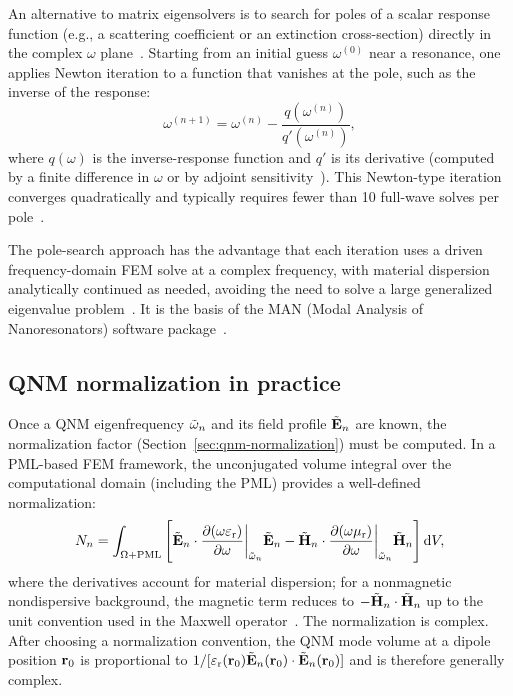 An alternative to matrix eigensolvers is to search for poles of a
scalar response function (e.g., a scattering coefficient or an
extinction cross-section) directly in the complex $\omega$
plane~\cite{wu2026rigorous}. Starting from an initial guess $\omega^{(0)}$
near a resonance, one applies Newton iteration to a function that
vanishes at the pole, such as the inverse of the response:
\begin{equation}
 \omega^{(n+1)} = \omega^{(n)}
 - \frac{q(\omega^{(n)})}{q'(\omega^{(n)})},
 \label{eq:pole-search-newton}
\end{equation}
where $q(\omega)$ is the inverse-response function and $q'$ is its derivative
(computed by a finite difference in $\omega$ or by adjoint sensitivity~\cite{v2024exact,ren2021quasinormal}).
This Newton-type iteration converges quadratically and typically
requires fewer than 10 full-wave solves per
pole~\cite{wu2026rigorous}.

The pole-search approach has the advantage that each iteration uses a
driven frequency-domain FEM solve at a complex frequency, with material
dispersion analytically continued as needed, avoiding the need to solve
a large generalized eigenvalue problem~\cite{wu2026rigorous,berlin2024poles}. It is the basis of the MAN (Modal Analysis
of Nanoresonators) software package~\cite{wu2026rigorous}.

\subsection{QNM normalization in practice}
\label{ssec:normalization-practice}

Once a QNM eigenfrequency $\tilde{\omega}_n$ and its field profile
$\tilde{\mathbf{E}}_n$ are known, the normalization factor
(Section~\ref{sec:qnm-normalization}) must be computed. In a PML-based
FEM framework, the unconjugated volume integral over the computational
domain (including the PML) provides a well-defined normalization:
\begin{equation}
 N_n = \int_{\Omega + \mathrm{PML}}
 \left[\tilde{\mathbf{E}}_n \cdot \frac{\partial (\omega\varepsilon_{\mathrm{r}})}{\partial \omega}\bigg|_{\tilde{\omega}_n}
 \tilde{\mathbf{E}}_n
 - \tilde{\mathbf{H}}_n \cdot \frac{\partial (\omega\mu_{\mathrm{r}})}{\partial \omega}\bigg|_{\tilde{\omega}_n}
 \tilde{\mathbf{H}}_n\right]\mathop{}\!\mathrm{d} V,
 \label{eq:normalization-pml}
\end{equation}
where the derivatives account for material dispersion; for a
nonmagnetic nondispersive background, the magnetic term reduces to
$-\tilde{\mathbf{H}}_n\cdot\tilde{\mathbf{H}}_n$ up to the unit convention used in the
Maxwell operator~\cite{wu2026rigorous}. The normalization is complex.
After choosing a normalization convention, the QNM mode volume at a
dipole position $\mathbf{r}_0$ is proportional to
$1/[\varepsilon_{\mathrm{r}}(\mathbf{r}_0)\tilde{\mathbf{E}}_n(\mathbf{r}_0)\cdot\tilde{\mathbf{E}}_n(\mathbf{r}_0)]$ and is
therefore generally complex.

